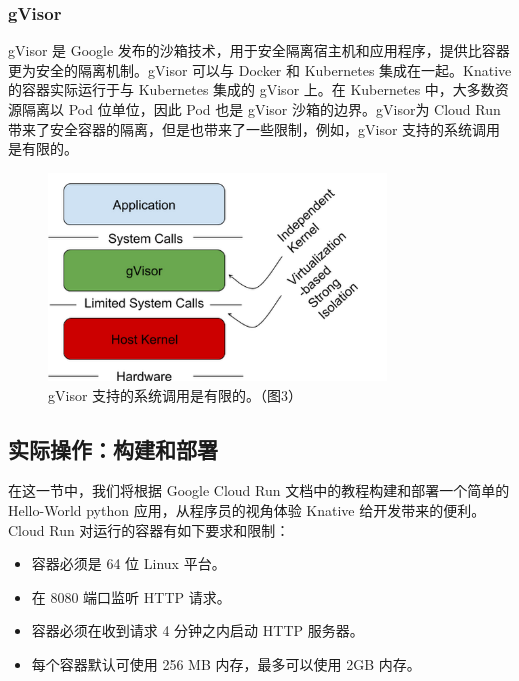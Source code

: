 \documentclass[11pt]{article}
\begin{document}
\subsubsection{gVisor}
gVisor 是 Google 发布的沙箱技术，用于安全隔离宿主机和应用程序，提供比容器更为安全的隔离机制。gVisor 可以与 Docker 和 Kubernetes 集成在一起。Knative 的容器实际运行于与 Kubernetes 集成的 gVisor 上。在 Kubernetes 中，大多数资源隔离以 Pod 位单位，因此 Pod 也是 gVisor 沙箱的边界\cite{knative-gvisor}。gVisor为 Cloud Run 带来了安全容器的隔离，但是也带来了一些限制，例如，gVisor 支持的系统调用是有限的\cite{cloudrun_contract}。

\begin{figure}[!htbp]
	\centering
	\includegraphics[width=0.8\textwidth]{figs/knative-gvisor.png}
	\caption{gVisor 支持的系统调用是有限的。（\cite{knative-gvisor}图3）}
	\label{knative-gvisor}
\end{figure}

\subsection{实际操作：构建和部署}
在这一节中，我们将根据 Google Cloud Run 文档中的教程\cite{cloudrun}构建和部署一个简单的 Hello-World python 应用，从程序员的视角体验 Knative 给开发带来的便利。Cloud Run 对运行的容器有如下要求和限制\cite{cloudrun_contract}：
\begin{itemize}
	\item 容器必须是 64 位 Linux 平台。
	\item 在 8080 端口监听 HTTP 请求。
	\item 容器必须在收到请求 4 分钟之内启动 HTTP 服务器。
	\item 每个容器默认可使用 256 MB 内存，最多可以使用 2GB 内存。
\end{itemize}
\end{document}
